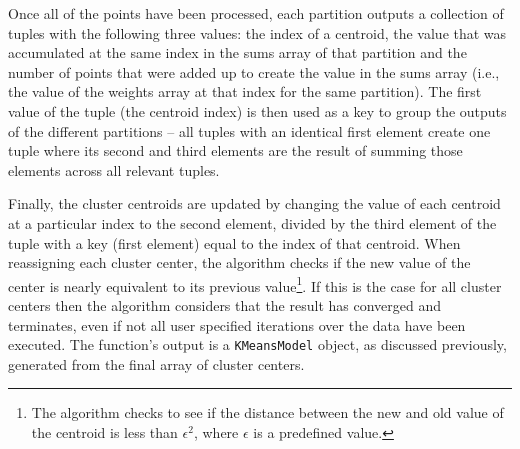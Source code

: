 \documentclass{l4proj}
\begin{document}
Once all of the points have been processed, each partition outputs a collection of tuples with the following three values: the index of a centroid, the value that was accumulated at the same index in the sums array of that partition and the number of points that were added up to create the value in the sums array (i.e., the value of the weights array at that index for the same partition). The first value of the tuple (the centroid index) is then used as a key to group the outputs of the different partitions -- all tuples with an identical first element create one tuple where its second and third elements are the result of summing those elements across all relevant tuples.

Finally, the cluster centroids are updated by changing the value of each centroid at a particular index to the second element, divided by the third element of the tuple with a key (first element) equal to the index of that centroid. When reassigning each cluster center, the algorithm checks if the new value of the center is nearly equivalent to its previous value\footnote{The algorithm checks to see if the distance between the new and old value of the centroid is less than $\epsilon^2$, where $\epsilon$ is a predefined value.}.  If this is the case for all cluster centers then the algorithm considers that the result has converged and terminates, even if not all user specified iterations over the data have been executed. The function's output is a \texttt{KMeansModel} object, as discussed previously, generated from the final array of cluster centers.
\end{document}
